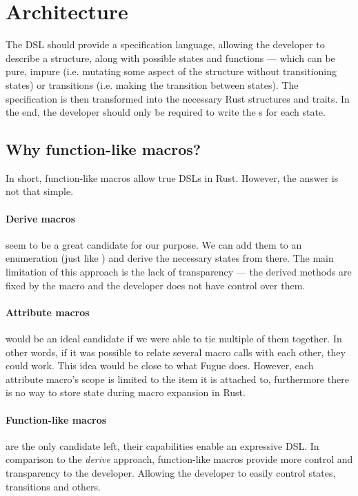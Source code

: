 \section{Architecture}\label{sec:arch}

The DSL should provide a specification language,
allowing the developer to describe a structure, along with possible states and functions ---
which can be pure, impure (i.e. mutating some aspect of the structure without transitioning states)
or transitions (i.e. making the transition between states).
The specification is then transformed into the necessary Rust structures and traits.
In the end, the developer should only be required to write the s for each state.

\subsection{Why function-like macros?}

In short, function-like macros allow true DSLs in Rust. However, the answer is not that simple.

\paragraph{Derive macros} seem to be a great candidate for our purpose.
We can add them to an enumeration (just like \autocite{Fitzgerald2019}) and derive the necessary states from there.
The main limitation of this approach is the lack of transparency —
the derived methods are fixed by the macro and the developer does not have control over them.

\paragraph{Attribute macros} would be an ideal candidate if we were able to tie multiple of them together.
In other words, if it was possible to relate several macro calls with each other, they could work.
This idea would be close to what Fugue \autocite{DeLine2004} does.
However, each attribute macro's scope is limited to the item it is attached to,
furthermore there is no way to store state during macro expansion in Rust.

\paragraph{Function-like macros} are the only candidate left, their capabilities enable an expressive DSL.
In comparison to the \emph{derive} approach, function-like macros provide more control and transparency to the developer.
Allowing the developer to easily control states, transitions and others.

